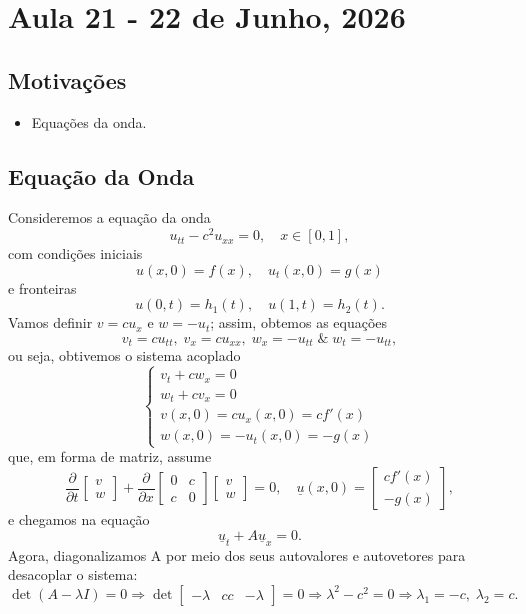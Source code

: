 \documentclass[../differential_methods.tex]{subfiles}
\begin{document}
\section{Aula 21 - 22 de Junho, 2026}
\subsection{Motivações}
\begin{itemize}
	\item Equações da onda.
\end{itemize}
\subsection{Equação da Onda}
Consideremos a equação da onda
\[
	u_{tt} - c^{2}u_{xx} = 0, \quad x\in [0, 1],
\]
com condições iniciais
\[
	u(x, 0) = f(x),\quad  u_{t}(x, 0) = g(x)
\]
e fronteiras
\[
	u(0, t) = h_1(t), \quad u(1, t)=h_2(t).
\]
Vamos definir \(v = cu_x\) e \(w=-u_t\); assim, obtemos as equações
\[
	v_{t} = cu_{tt},\; v_{x} = cu_{xx},\; w_{x} = -u_{tt} \;\&\; w_{t} = -u_{tt},
\]
ou seja, obtivemos o sistema acoplado
\[
	\left\{\begin{array}{ll}
		v_t + cw_x =0                 \\
		w_t + cv_x = 0                \\
		v(x, 0) = cu_x(x, 0) = cf'(x) \\
		w(x, 0) = -u_t(x, 0) = -g(x)
	\end{array}\right.
\]
que, em forma de matriz, assume
\[
	\frac{\partial^{}}{\partial t^{}}\begin{bmatrix}
		v \\
		w
	\end{bmatrix} + \frac{\partial^{}}{\partial x^{}} \begin{bmatrix}
		0 & c \\
		c & 0
	\end{bmatrix} \begin{bmatrix}
		v \\
		w
	\end{bmatrix} = 0, \quad \underline{u}(x, 0) = \begin{bmatrix}
		cf'(x) \\
		-g(x)
	\end{bmatrix},
\]
e chegamos na equação
\[
	\underline{u}_t + A \underline{u}_x = 0.
\]
Agora, diagonalizamos A por meio dos seus autovalores e autovetores para desacoplar o sistema:
\[
	\det{(A-\lambda I)}=0 \Rightarrow \det \begin{bmatrix}
		-\lambda & c
		c        & -\lambda
	\end{bmatrix} =0 \Rightarrow \lambda^{2} - c^{2}=0 \Rightarrow \lambda_1 = -c, \; \lambda_2 = c.
\]
\end{document}
